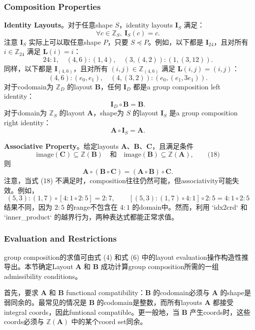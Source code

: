 \documentclass{article}
\begin{document}
\subsubsection{Composition Properties}
\textbf{Identity Layouts}。对于任意shape \(S\)，identity layouts \(\mathbf{I}_S\) 满足：
\[
\forall c\in \mathbb{Z}_S,\ \mathbf{I}_S(c) = c.
\]
注意 \(\mathbf{I}_S\) 实际上可以取任意shape \(P\)，只要 \(S\preceq P\)。例如，以下都是 \(\mathbf{I}_{24}\)，且对所有 \(i\in\mathbb{Z}_{24}\) 满足 \(\mathbf{L}(i)=i\)：
\[
24:1,\quad (4,6):(1,4),\quad (3,(4,2)):(1,(3,12)).
\]
同样，以下都是 \(\mathbf{I}_{(4,6)}\)，且对所有 \((i,j)\in\mathbb{Z}_{(4,6)}\) 满足 \(\mathbf{L}(i,j)=(i,j)\)：
\[
(4,6):(e_0,e_1),\quad (4,(3,2)):(e_0,(e_1,3e_1)).
\]
对于codomain为 \(\mathbb{Z}_D\) 的layout \(\mathbf{B}\)，任何 \(\mathbf{I}_D\) 都是a group composition left identity：
\[
\mathbf{I}_D\circ \mathbf{B} = \mathbf{B}.
\]
对于domain为 \(\mathbb{Z}_S\) 的layout \(\mathbf{A}\)，shape为 \(S\) 的layout \(\mathbf{I}_S\) 是a group composition right identity：
\[
\mathbf{A}\circ \mathbf{I}_S = \mathbf{A}.
\]

\textbf{Associative Property}。给定layouts \(\mathbf{A}\)、\(\mathbf{B}\)、\(\mathbf{C}\)，且满足条件
\[
\mathrm{image}(\mathbf{C})\subseteq \mathbb{Z}(\mathbf{B})\quad \text{和}\quad \mathrm{image}(\mathbf{B})\subseteq \mathbb{Z}(\mathbf{A}), \qquad \text{(18)}
\]
则
\[
\mathbf{A}\circ (\mathbf{B}\circ \mathbf{C}) = (\mathbf{A}\circ \mathbf{B})\circ \mathbf{C}.
\]
注意，当式 (18) 不满足时，composition往往仍然可能，但associativity可能失效。例如，
\[
(5,3):(1,7)\circ [4:1\circ 2:5] = 2:7,\qquad
[(5,3):(1,7)\circ 4:1]\circ 2:5 = 4:1\circ 2:5
\]
结果不同，因为 \(2:5\) 的range不包含在 \(4:1\) 的domain中。然而，利用 `idx2crd` 和 `inner\_product` 的越界行为，两种表达式都能正常求值。
\subsubsection{Evaluation and Restrictions}
group composition的求值可由式 (4) 和式 (6) 中的layout evaluation操作构造性推导出。本节确定Layout \(\mathbf{A}\) 和 \(\mathbf{B}\) 成功计算group composition所需的一组admissibility conditions。

首先，要求 \(\mathbf{A}\) 和 \(\mathbf{B}\) functional compatibility：\(\mathbf{B}\) 的codomain必须与 \(\mathbf{A}\) 的shape是弱同余的。最常见的情况是 \(\mathbf{B}\) 的codomain是整数，而所有layouts \(\mathbf{A}\) 都接受integral coords，因此funtional compatible。更一般地，当 \(\mathbf{B}\) 产生coords时，这些coords必须与 \(\mathbb{Z}(\mathbf{A})\) 中的某个coord set同余。
\end{document}
